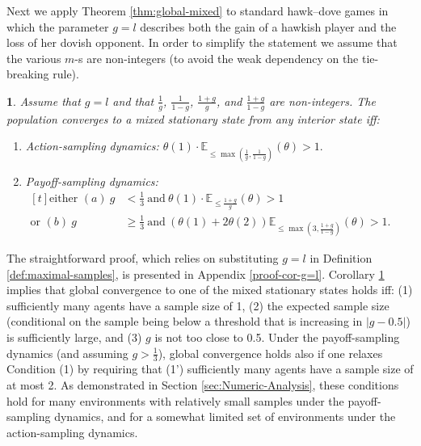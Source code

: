\documentclass[12pt]{article}
\numberwithin{equation}{section}
\numberwithin{figure}{section}
\theoremstyle{definition}
\theoremstyle{plain}
\theoremstyle{plain}
\theoremstyle{plain}
\theoremstyle{remark}
\theoremstyle{plain}
\theoremstyle{plain}
\newtheorem{cor}{\protect\corollaryname}
\providecommand{\corollaryname}{Corollary}
\begin{document}
Next we apply Theorem \ref{thm:global-mixed} to standard hawk--dove games in which the parameter $g=l$ 
describes both the gain of a hawkish player and the loss of her dovish opponent. 
In order to simplify the statement we assume that the various $m$-s are non-integers (to avoid the weak dependency on the tie-breaking rule).
\begin{cor}\label{cor:g=l}
Assume that $g=l$ and that $\frac{1}{g}$, $\frac{1}{1-g}$, $\frac{1+g}{g}$, and $\frac{1+g}{1-g}$ are non-integers. The population converges to a mixed stationary state from any interior state iff:
\begin{enumerate}
    \item Action-sampling dynamics: $\theta(1)\cdot\mathbb{E}_{\leq \max\left(\frac{1}{g},\frac{1}{1-g}\right)}\left(\theta\right)>1.$
    \item Payoff-sampling dynamics: $\begin{aligned}[t]
   \text{either } 
   (a) \ g&<\frac{1}{3} \ \text{and} \ \theta(1)\cdot\mathbb{E}_{\leq \frac{1+g}{g}}\left(\theta\right)>1\\
        \text{or } (b) \ g&\geq\frac{1}{3} \ \text{and}  \ (\theta(1)+2\theta(2))\mathbb{E}_{\leq \max\left(3,\frac{1+g}{1-g}\right)}\left(\theta\right)>1.                      \end{aligned}$
   \end{enumerate}
\end{cor}
The straightforward proof, which relies on substituting $g=l$ in Definition \ref{def:maximal-samples}, is presented in Appendix \ref{proof-cor-g=l}.
Corollary \ref{cor:g=l} implies that global convergence to one of the mixed stationary states holds iff: (1) sufficiently many agents have a sample size of 1, (2) the expected sample size 
(conditional on the sample being below a threshold that is increasing in $|g-0.5|$) is sufficiently large, and (3) $g$  is not too close to 0.5. Under the payoff-sampling dynamics (and assuming $g>\frac{1}{3}$), global convergence holds also if one relaxes Condition (1) by requiring that (1') sufficiently many agents have a sample size of at most 2.
As demonstrated in Section \ref{sec:Numeric-Analysis}, these conditions hold for many environments with 
relatively small samples under the payoff-sampling dynamics, and for a somewhat limited set of environments under the action-sampling dynamics.
\end{document}
